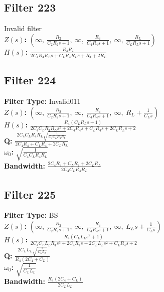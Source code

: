 \documentclass{article}
\begin{document}
\subsection*{Filter 223}
Invalid filter \\ 
\textbf{$Z(s)$:} $\left( \infty, \  \frac{R_{2}}{C_{2} R_{2} s + 1}, \  \infty, \  \frac{R_{4}}{C_{4} R_{4} s + 1}, \  \infty, \  \frac{R_{L}}{C_{L} R_{L} s + 1}\right)$ \\ 
\textbf{$H(s)$:} $\frac{R_{4} R_{L}}{2 C_{4} R_{4} R_{L} s + C_{L} R_{4} R_{L} s + R_{4} + 2 R_{L}}$ \\ 
\subsection*{Filter 224}
\textbf{Filter Type:} Invalid011 \\ 
\textbf{$Z(s)$:} $\left( \infty, \  \frac{R_{2}}{C_{2} R_{2} s + 1}, \  \infty, \  \frac{R_{4}}{C_{4} R_{4} s + 1}, \  \infty, \  R_{L} + \frac{1}{C_{L} s}\right)$ \\ 
\textbf{$H(s)$:} $\frac{R_{4} \left(C_{L} R_{L} s + 1\right)}{2 C_{4} C_{L} R_{4} R_{L} s^{2} + 2 C_{4} R_{4} s + C_{L} R_{4} s + 2 C_{L} R_{L} s + 2}$ \\ 
\textbf{Q:} $\frac{2 C_{4} C_{L} R_{4} R_{L} \sqrt{\frac{1}{C_{4} C_{L} R_{4} R_{L}}}}{2 C_{4} R_{4} + C_{L} R_{4} + 2 C_{L} R_{L}}$ \\ 
\textbf{$\omega_0$:} $\sqrt{\frac{1}{C_{4} C_{L} R_{4} R_{L}}}$ \\ 
\textbf{Bandwidth:} $\frac{2 C_{4} R_{4} + C_{L} R_{4} + 2 C_{L} R_{L}}{2 C_{4} C_{L} R_{4} R_{L}}$ \\ 
\subsection*{Filter 225}
\textbf{Filter Type:} BS \\ 
\textbf{$Z(s)$:} $\left( \infty, \  \frac{R_{2}}{C_{2} R_{2} s + 1}, \  \infty, \  \frac{R_{4}}{C_{4} R_{4} s + 1}, \  \infty, \  L_{L} s + \frac{1}{C_{L} s}\right)$ \\ 
\textbf{$H(s)$:} $\frac{R_{4} \left(C_{L} L_{L} s^{2} + 1\right)}{2 C_{4} C_{L} L_{L} R_{4} s^{3} + 2 C_{4} R_{4} s + 2 C_{L} L_{L} s^{2} + C_{L} R_{4} s + 2}$ \\ 
\textbf{Q:} $\frac{2 C_{L} L_{L} \sqrt{\frac{1}{C_{L} L_{L}}}}{R_{4} \left(2 C_{4} + C_{L}\right)}$ \\ 
\textbf{$\omega_0$:} $\sqrt{\frac{1}{C_{L} L_{L}}}$ \\ 
\textbf{Bandwidth:} $\frac{R_{4} \left(2 C_{4} + C_{L}\right)}{2 C_{L} L_{L}}$ \\ 
\end{document}
